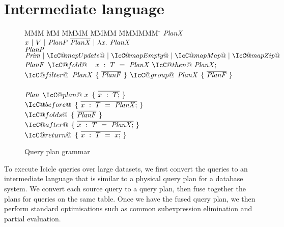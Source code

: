 \section{Intermediate language}
\label{icicle:s:IcicleCore}

\begin{figure}

\begin{tabbing}
MMM \= MM \= MMMM \= MMMM \= MMMMMM \= \kill
$\mathit{PlanX}$
\GrammarDefTab
  $x~|~V~|~\mathit{PlanP}~\overline{\mathit{PlanX}}~|~\lambda{}x.~\mathit{PlanX}$
\\
$\mathit{PlanP}$
\GrammarDefTab
  $\mi{Prim}~|~\IcC@mapUpdate@~|~\IcC@mapEmpty@~|~\IcC@mapMap@~|~\IcC@mapZip@$
\\
$\mathit{PlanF}$
\GrammarDefTab
 $\IcC@fold@$ \> $~~x~:~T~=~\mi{PlanX}~\IcC@then@~\mi{PlanX};$
\GrammarAlt
 $\IcC@filter@$ \> $\mathit{PlanX}$ \> $\{~\overline{\mathit{PlanF}}~\}$
\GrammarAlt
  $\IcC@group@$ \> $\mathit{PlanX}$ \> $\{~\overline{\mathit{PlanF}}~\}$
\\
\\
$\mathit{Plan}$
\GrammarDefTab
  $\IcC@plan@~x$ \> $\{~\overline{x~:~T;}~\}$
\\
  \> \> $\IcC@before@$ \> $\{~\overline{x~:~T~=~\mathit{PlanX};}~\}$ \\
  \> \> $\IcC@folds@$  \> $\{~\overline{\mathit{PlanF}}~\}$ \\
  \> \> $\IcC@after@$  \> $\{~\overline{x~:~T~=~\mathit{PlanX};}~\}$ \\
  \> \> $\IcC@return@$ \> $\{~\overline{x~:~T~=~x;}~\}$ \\
\end{tabbing}



\caption{Query plan grammar}
\label{icicle:fig:core:grammar}
\end{figure}

To execute Icicle queries over large datasets, we first convert the queries to an intermediate language that is similar to a physical query plan for a database system.
We convert each source query to a query plan, then fuse together the plans for queries on the same table.
Once we have the fused query plan, we then perform standard optimisations such as common subexpression elimination and partial evaluation.

